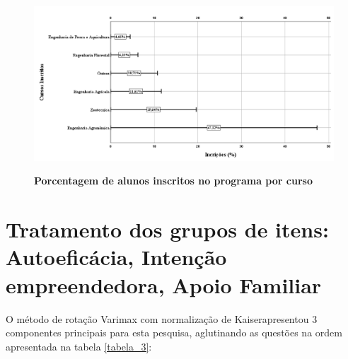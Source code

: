 \begin{figure}[!htb]
\centering
\caption{\textbf{Porcentagem de alunos inscritos no programa por curso}}
\includegraphics[scale=0.4]{Imagens/inscritos.png}
\label{figura_10}
\end{figure}

\newpage

\section{Tratamento dos grupos de itens: Autoeficácia, Intenção empreendedora, Apoio Familiar}

O método de rotação Varimax com normalização de Kaiser\footnotemark[1] apresentou 3 componentes principais para esta pesquisa, aglutinando as questões na ordem apresentada na tabela \ref{tabela_3}:


